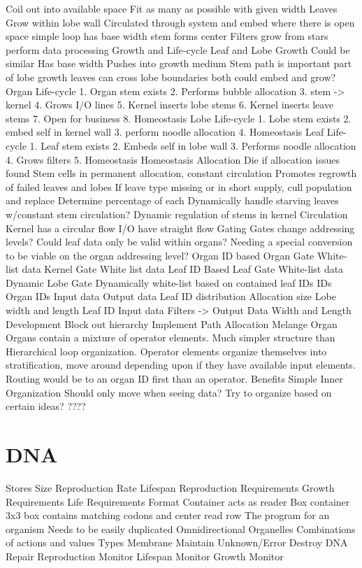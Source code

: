 \documentclass[article,12pt,oneside]{memoir}
\begin{document}
Coil out into available space
Fit as many as possible with given width
Leaves
Grow within lobe wall
Circulated through system and embed where there is open space
simple loop
has base width
stem forms center
Filters grow from stars
perform data processing
Growth and Life-cycle
Leaf and Lobe Growth
Could be similar
Has base width
Pushes into growth medium
Stem path is important part of lobe growth
leaves can cross lobe boundaries
both could embed and grow?
Organ Life-cycle
1. Organ stem exists
2. Performs bubble allocation
3. stem -> kernel
4. Grows I/O lines
5. Kernel inserts lobe stems
6. Kernel inserts leave stems
7. Open for business
8. Homeostasis
Lobe Life-cycle
1. Lobe stem exists
2. embed self in kernel wall
3. perform noodle allocation
4. Homeostasis
Leaf Life-cycle
1. Leaf stem exists
2. Embeds self in lobe wall
3. Performs noodle allocation
4. Grows filters
5. Homeostasis
Homeostasis
Allocation
Die if allocation issues found
Stem cells in permanent allocation, constant circulation
Promotes regrowth of failed leaves and lobes
If leave type missing or in short supply, cull population and replace
Determine percentage of each
Dynamically handle %
starving leaves w/constant stem circulation?
Dynamic regulation of stems in kernel
Circulation
Kernel has a circular flow
I/O have straight flow
Gating
Gates change addressing levels? Could leaf data only be valid within organs? Needing a special conversion to be viable on the organ addressing level?
Organ ID based
Organ Gate
White-list data
Kernel Gate
White list data
Leaf ID Based
Leaf Gate
White-list data
Dynamic
Lobe Gate
Dynamically white-list based on contained leaf IDs
IDs
Organ IDs
Input data
Output data
Leaf ID distribution
Allocation size
Lobe width and length
Leaf ID
Input data
Filters -> Output Data
Width and Length
Development
Block out hierarchy
Implement Path Allocation
Melange Organ
Organs contain a mixture of operator elements. Much simpler structure than Hierarchical loop organization. Operator elements organize themselves into stratification, move around depending upon if they have available input elements.
Routing would be to an organ ID first than an operator.
Benefits
Simple
Inner Organization
Should only move when seeing data? Try to organize based on certain ideas?
????



\section{DNA}
Stores
Size
Reproduction Rate
Lifespan
Reproduction Requirements
Growth Requirements
Life Requirements
Format
Container acts as reader
Box container
3x3 box contains matching codons and center read row
The program for an organism
Needs to be easily duplicated
Omnidirectional
Organelles
Combinations of actions and values
Types
Membrane Maintain
Unknown​/Error Destroy
DNA Repair
Reproduction Monitor
Lifespan Monitor
Growth Monitor
\end{document}

